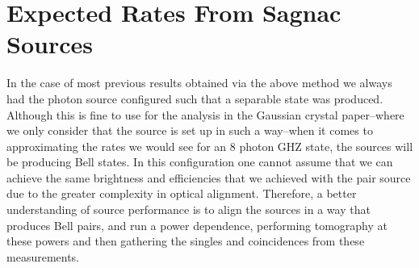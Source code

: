 \documentclass[aps,floatfix,superscriptaddress,onecolumn,tightenlines,amsmath,amssymb,nofootinbib,raggedbottom,nobalancelastpage,10pt]{revtex4-2}
\begin{document}
\section*{Expected Rates From Sagnac Sources} 

In the case of most previous results obtained via the above method we always had the photon source configured such that a separable state was produced. Although this is fine to use for the analysis in the Gaussian crystal paper--where we only consider that the source is set up in such a way--when it comes to approximating the rates we would see for an 8 photon GHZ state, the sources will be producing Bell states. In this configuration one cannot assume that we can achieve the same brightness and efficiencies that we achieved with the pair source due to the greater complexity in optical alignment. Therefore, a better understanding of source performance is to align the sources in a way that produces Bell pairs, and run a power dependence, performing tomography at these powers and then gathering the singles and coincidences from these measurements. 


% 
%    
\end{document}
